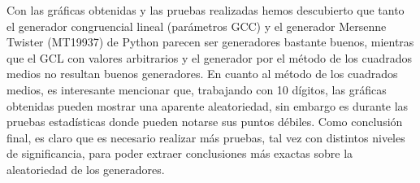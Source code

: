 Con las gráficas obtenidas y las pruebas realizadas hemos descubierto que tanto el generador congruencial lineal (parámetros GCC) y el generador Mersenne Twister (MT19937) de Python parecen ser generadores bastante buenos, mientras que el GCL con valores arbitrarios y el generador por el método de los cuadrados medios no resultan buenos generadores. En cuanto al método de los cuadrados medios, es interesante mencionar que, trabajando con 10 dígitos, las gráficas obtenidas pueden mostrar una aparente aleatoriedad, sin embargo es durante las pruebas estadísticas donde pueden notarse sus puntos débiles. Como conclusión final, es claro que es necesario realizar más pruebas, tal vez con distintos niveles de significancia, para poder extraer conclusiones más exactas sobre la aleatoriedad de los generadores.